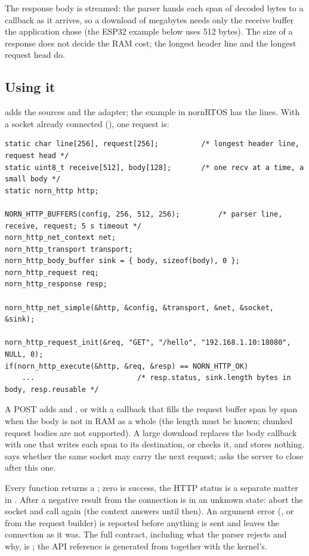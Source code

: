 The response body is streamed: the parser hands each span of decoded bytes to a
callback as it arrives, so a download of megabytes needs only the receive buffer the
application chose (the ESP32 example below uses 512 bytes). The size of a response does
not decide the RAM cost; the longest header line and the longest request head do.

\subsection{Using it}

 adds the sources and the adapter; the  example in
nornRTOS has the lines. With a socket already connected (), one
request is:

\begin{lstlisting}
static char line[256], request[256];          /* longest header line, request head */
static uint8_t receive[512], body[128];       /* one recv at a time, a small body */
static norn_http http;

NORN_HTTP_BUFFERS(config, 256, 512, 256);         /* parser line, receive, request; 5 s timeout */
norn_http_net_context net;
norn_http_transport transport;
norn_http_body_buffer sink = { body, sizeof(body), 0 };
norn_http_request req;
norn_http_response resp;

norn_http_net_simple(&http, &config, &transport, &net, &socket, &sink);

norn_http_request_init(&req, "GET", "/hello", "192.168.1.10:18080", NULL, 0);
if(norn_http_execute(&http, &req, &resp) == NORN_HTTP_OK)
    ...                        /* resp.status, sink.length bytes in body, resp.reusable */
\end{lstlisting}

A POST adds 
and , or
 with a callback that
fills the request buffer span by span when the body is not in RAM as a whole (the
length must be known; chunked request bodies are not supported). A large download replaces the body
callback with one that writes each span to its destination, or checks it, and stores
nothing.  says whether the same socket may carry the next request;
 asks the server to close after this one.

Every function returns a ; zero is success, the HTTP status is
a separate matter in . After a negative result from
 the connection is in an unknown state: abort the socket and
call  again (the context answers  until
then). An argument error (, or  from the request builder) is
reported before anything is sent and leaves the connection as it was. The full
contract, including what the parser rejects and why, is ;
the API reference is generated from  together with the kernel's.


